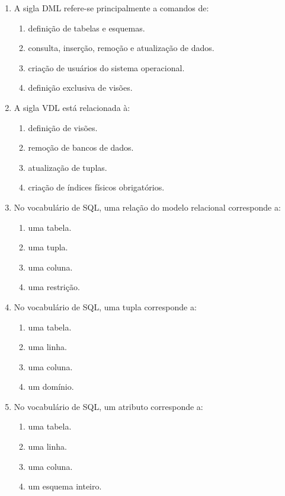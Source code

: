 \documentclass[12pt,a4paper]{article}
\begin{document}
\begin{enumerate}[label=\textbf{Q\arabic*.}]
\item A sigla DML refere-se principalmente a comandos de:

\begin{enumerate}[label=\alph*)]
    \item definição de tabelas e esquemas.
    \item consulta, inserção, remoção e atualização de dados.
    \item criação de usuários do sistema operacional.
    \item definição exclusiva de visões.
\end{enumerate}

\item A sigla VDL está relacionada à:

\begin{enumerate}[label=\alph*)]
    \item definição de visões.
    \item remoção de bancos de dados.
    \item atualização de tuplas.
    \item criação de índices físicos obrigatórios.
\end{enumerate}

\item No vocabulário de SQL, uma relação do modelo relacional corresponde a:

\begin{enumerate}[label=\alph*)]
    \item uma tabela.
    \item uma tupla.
    \item uma coluna.
    \item uma restrição.
\end{enumerate}

\item No vocabulário de SQL, uma tupla corresponde a:

\begin{enumerate}[label=\alph*)]
    \item uma tabela.
    \item uma linha.
    \item uma coluna.
    \item um domínio.
\end{enumerate}

\item No vocabulário de SQL, um atributo corresponde a:

\begin{enumerate}[label=\alph*)]
    \item uma tabela.
    \item uma linha.
    \item uma coluna.
    \item um esquema inteiro.
\end{enumerate}


\end{enumerate}
\end{document}

